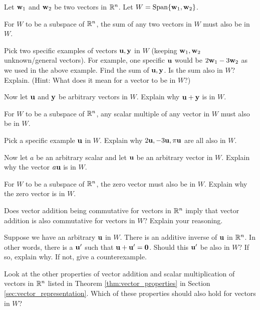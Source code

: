 \begin{pa} \label{pa:3_a} Let $\mathbf{w}_1$ and $\mathbf{w}_2$ be two vectors in $\mathbb{R}^n$. Let $W = \text{Span} \{\mathbf{w}_1, \mathbf{w}_2\}$. 
\be
\item For $W$ to be a subspace of $\mathbb{R}^n$, the sum of any two vectors in $W$ must also be in $W$.
    \ba
    \item Pick two specific examples of vectors $\mathbf{u}, \mathbf{y}$ in $W$ (keeping $\mathbf{w}_1, \mathbf{w}_2$ unknown/general vectors). For example, one specific $\mathbf{u}$ would be $2\mathbf{w}_1-3\mathbf{w}_2$ as we used in the above example. Find the sum of $\mathbf{u}, \mathbf{y}$. Is the sum also in $W$? Explain. (Hint: What does it mean for a vector to be in $W$?)
		
		
		
		\item Now let $\mathbf{u}$ and $\mathbf{y}$ be arbitrary vectors in $W$. Explain why $\mathbf{u} + \mathbf{y}$ is in $W$.

    



	\ea
	
\item For $W$ to be a subspace of $\mathbb{R}^n$, any scalar multiple of any vector in $W$ must also be in $W$. 

	\ba 
	\item Pick a specific example $\mathbf{u}$ in $W$. Explain why $2\mathbf{u}, -3\mathbf{u}, \pi\mathbf{u}$ are all also in $W$.



	\item Now let $a$ be an arbitrary scalar and let $\mathbf{u}$ be an arbitrary vector in $W$. Explain why the vector $a \mathbf{u}$ is in $W$.

    
		
		
	\ea


\item For $W$ to be a subspace of $\mathbb{R}^n$, the zero vector must also be in $W$. Explain why the zero vector is in $W$. 

    
		
		


\item Does vector addition being commutative for vectors in $\mathbb{R}^n$ imply that vector addition is also commutative for vectors in $W$? Explain your reasoning.






\item Suppose we have an arbitrary $\mathbf{u}$ in $W$. There is an additive inverse of $\mathbf{u}$ in $\mathbb{R}^n$. In other words, there is a $\mathbf{u}'$ such that $\mathbf{u}+
\mathbf{u}'=\mathbf{0}$. Should this $\mathbf{u}'$ be also in $W$? If so, explain why. If not, give a counterexample.



\item Look at the other properties of vector addition and scalar multiplication of vectors in $\mathbb{R}^n$ listed in Theorem \ref{thm:vector_properties} in Section \ref{sec:vector_representation}. Which of these properties should also hold for vectors in $W$? 




    
\ee
    
\end{pa}


